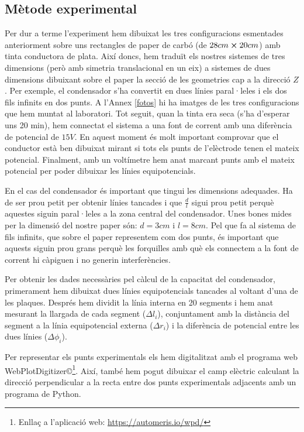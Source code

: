 \documentclass[11pt]{article}
\numberwithin{equation}{section}
\numberwithin{figure}{section}
\numberwithin{table}{section}
\begin{document}
\subsection{Mètode experimental}\label{sec: metode}
Per dur a terme l'experiment hem dibuixat les tres configuracions esmentades anteriorment sobre uns rectangles de paper de carbó (de $28cm\cross20cm$) amb tinta conductora de plata. Així doncs, hem traduït els nostres sistemes de tres dimensions (però amb simetria translacional en un eix) a sistemes de dues dimensions dibuixant sobre el paper la secció de les geometries cap a la direcció $Z$. Per exemple, el condensador s'ha convertit en dues línies paral·leles i els dos fils infinits en dos punts. A l'Annex \ref{fotos} hi ha imatges de les tres configuracions que hem muntat al laboratori. Tot seguit, quan la tinta era seca (s'ha d'esperar uns 20 min), hem connectat el sistema a una font de corrent amb una diferència de potencial de $15 V$. En aquest moment és molt important comprovar que el conductor està ben dibuixat mirant si tots els punts de l'elèctrode tenen el mateix potencial. Finalment, amb un voltímetre hem anat marcant punts amb el mateix potencial per poder dibuixar les línies equipotencials.

En el cas del condensador és important que tingui les dimensions adequades. Ha de ser prou petit per obtenir línies tancades i que $\frac{d}{l}$ sigui prou petit perquè aquestes siguin paral·leles a la zona central del condensador. Unes bones mides per la dimensió del nostre paper són: $d=3cm$ i $l=8cm$.
Pel que fa al sistema de fils infinits, que sobre el paper representem com dos punts, és important que aquests siguin prou grans perquè les forquilles amb què els connectem a la font de corrent hi càpiguen i no generin interferències.

Per obtenir les dades necessàries pel càlcul de la capacitat del condensador, primerament hem dibuixat dues línies equipotencials tancades al voltant d'una de les plaques. Després hem dividit la línia interna en 20 segments i hem anat mesurant la llargada de cada segment ($\Delta l_i$), conjuntament amb la distància del segment a la línia equipotencial externa ($\Delta r_i$) i la diferència de potencial entre les dues línies ($\Delta \phi_i$).

Per representar els punts experimentals els hem digitalitzat amb el programa web WebPlotDigitizer\copyright\footnote{Enllaç a l'aplicació web: \url{https://automeris.io/wpd/}}. Així, també hem pogut dibuixar el camp elèctric calculant la direcció perpendicular a la recta entre dos punts experimentals adjacents amb un programa de Python.
\end{document}
